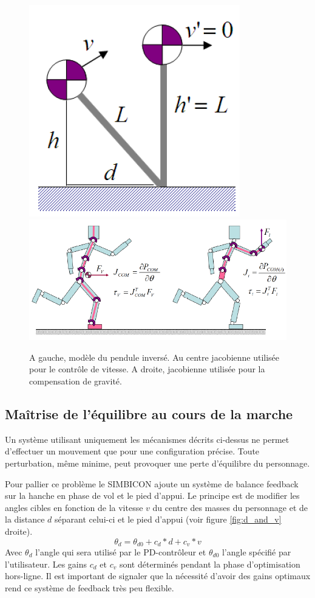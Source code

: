 \documentclass[runningheads,a4paper]{llncs}
\begin{document}
\begin{figure}[h]
\centering
\includegraphics[scale=0.5]{IPM.png}
\includegraphics[scale=0.5]{shema_jacobians.png}
\caption{A gauche, modèle du pendule inversé. Au centre jacobienne utilisée pour le contrôle de vitesse. A droite, jacobienne utilisée pour la compensation de gravité. \cite{coros2010generalized} }
\label{fig:ipm}
\label{fig:jacob}
\end{figure}

\subsection{Maîtrise de l'équilibre au cours de la marche}

Un système utilisant uniquement les mécanismes décrits ci-dessus ne permet d'effectuer un mouvement que pour une configuration précise. Toute perturbation, même minime, peut provoquer une perte d'équilibre du personnage.

Pour pallier ce problème le SIMBICON ajoute un système de balance feedback sur la hanche en phase de vol et le pied d'appui. Le principe est de modifier les angles cibles en fonction de la vitesse $v$ du centre des masses du personnage et de la distance \(d\) séparant celui-ci et le pied d'appui (voir figure \ref{fig:d_and_v} droite). 
\[
\theta_d=\theta_{d0} + c_d*d + c_v*v 
\]
Avec \(\theta_d\) l'angle qui sera utilisé par le PD-contrôleur et \(\theta_{d0}\) l'angle spécifié par l'utilisateur.
Les gains \(c_d\) et \(c_v\) sont déterminés pendant la phase d'optimisation hors-ligne. Il est important de signaler que la nécessité d'avoir des gains optimaux rend ce système de feedback très peu flexible.
\end{document}
